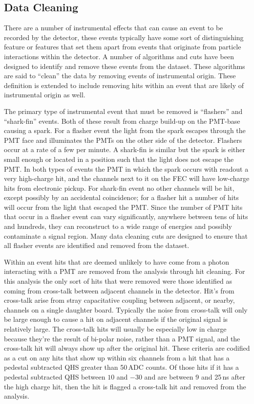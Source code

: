 \subsection{Data Cleaning}
There are a number of instrumental effects that can cause an event
to be recorded by the detector, these events typically have some
sort of distinguishing feature or features that set them apart
from events that originate from particle interactions within the
detector.
A number of algorithms and cuts have been designed to identify and remove
these events from the dataset.
These algorithms are said to ``clean'' the data by removing events
of instrumental origin. These definition is extended to include removing
hits within an event that are likely of instrumental origin as well.

The primary type of instrumental event that must be removed is ``flashers'' and
``shark-fin'' events.
Both of these result from charge build-up on the PMT-base causing a
spark.
For a flasher event the light from the spark escapes through the PMT face
and illuminates the PMTs on the other side of the detector.
Flashers occur at a rate of a few per minute.
A shark-fin is similar but the spark is either small enough or located
in a position such that the light does not escape the PMT.\@
In both types of events the PMT in which the spark occurs with readout
a very high-charge hit, and the channels next to it on the FEC will
have low-charge hits from electronic pickup.
For shark-fin event no other channels will be hit, except possibly by an
accidental coincidence; for a flasher hit a number of hits will
occur from the light that escaped the PMT.\@
Since the number of PMT hits that occur in a flasher event can vary significantly,
anywhere between tens of hits and hundreds, they can reconstruct
to a wide range of energies and possibly contaminate a signal region.
Many data cleaning cuts are designed to ensure that all
flasher events are identified and removed from the dataset.

Within an event hits that are deemed unlikely to have come from a photon interacting with a PMT
are removed from the analysis through hit cleaning.
For this analysis the only sort of hits that were removed were those identified
as coming from cross-talk between adjacent channels in the detector.
Hit's from cross-talk arise from stray capacitative coupling between adjacent, or nearby, channels
on a single daughter board.
Typically the noise from cross-talk will only be large enough to cause a hit
on adjacent channels if the original signal is relatively large.
The cross-talk hits will usually be especially low in charge because they're
the result of bi-polar noise, rather than a PMT signal, and the cross-talk
hit will always show up after the original hit.
These criteria are codified as a cut on any hits that show up within
 six channels from a hit that has a pedestal subtracted QHS greater
than 50\,ADC counts. Of those hits if it has a pedestal subtracted QHS between
$10$ and $-30$ and are between 9 and 25\,ns after the high charge hit,
then the hit is flagged a cross-talk hit and removed from the analysis.

